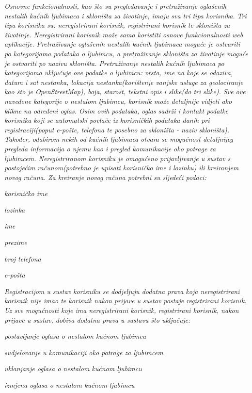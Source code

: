 		\textit{Osnovne funkcionalnosti, kao što su pregledavanje i pretraživanje oglašenih nestalih kućnih ljubimaca i skloništa za životinje, imaju sva tri tipa korisnika. Tri tipa korisnika su: neregistrirani korisnik, registrirani korisnik te skloništa za životinje. Neregistrirani korisnik može samo koristiti osnove funkcionalnosti web aplikacije. Pretraživanje oglašenih nestalih kućnih ljubimaca moguće je ostvariti po kategorijama podataka o ljubimcu, a pretraživanje skloništa za životinje moguće je ostvariti po nazivu skloništa. Pretraživanje nestalih kućnih ljubimaca po kategorijama uključuje ove podatke o ljubimcu: vrsta, ime na koje se odaziva, datum i sat nestanka, lokacija nestanka(korištenje vanjske usluge za geolociranje kao što je OpenStreetMap), boja, starost, tekstni opis i slike(do tri slike). Sve ove navedene kategorije o nestalom ljubimcu, korisnik može detaljnije vidjeti ako klikne na određeni oglas. Osim ovih podataka, oglas sadrži i kontakt podatke korisnika koji se automatski povlače iz korisničkih podataka danih pri registraciji(poput e-pošte, telefona te posebno za skloništa - naziv skloništa). Također, odabirom nekih od kućnih ljubimaca otvara se mogućnost detaljnijeg pregleda informacija o njemu kao i pregled komunikacije oko potrage za ljubimcem. Neregistriranom korisniku je omogućeno prijavljivanje u sustav s postojećim računom(potrebno je upisati korisničko ime i lozinku) ili kreiranjem novog računa.  Za kreiranje novog računa potrebni su sljedeći podaci:}
		
		\begin{packed_item}
			\item \textit{korisničko ime}
			\item \textit{lozinka}
			\item \textit{ime}
			\item \textit{prezime}
			\item \textit{broj telefona}
			\item \textit{e-pošta}
		\end{packed_item}
		
		\textit{Registracijom u sustav korisniku se dodjeljuju dodatna prava koja neregistrirani korisnik nije imao te korisnik nakon prijave u sustav postaje registrirani korisnik. Uz sve mogućnosti koje ima neregistrirani korisnik, registrirani korisnik, nakon prijave u sustav, dobiva dodatna prava u sustavu što uključuje:}
		
		\begin{packed_item}
			\item \textit{postavljanje oglasa o nestalom kućnom ljubimcu}
			\item \textit{sudjelovanje u komunikaciji oko potrage za ljubimcem}
			\item \textit{uklanjanje oglasa o nestalom kućnom ljubimcu}
			\item \textit{izmjena oglasa o nestalom kućnom ljubimcu}
		\end{packed_item}
		
